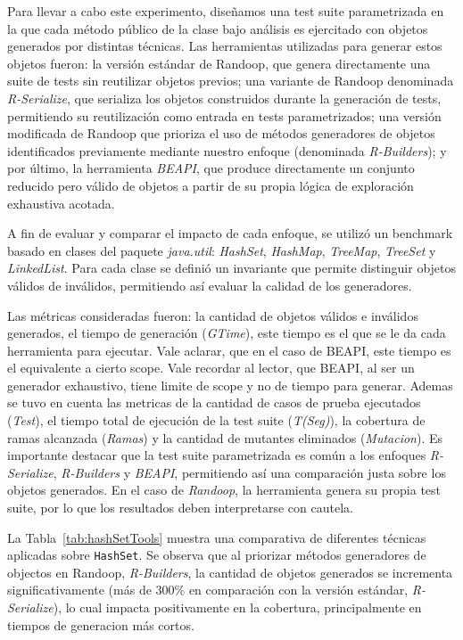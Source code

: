 Para llevar a cabo este experimento, diseñamos una test suite parametrizada en la que cada método 
público de la clase bajo análisis es ejercitado con objetos generados por distintas técnicas. Las 
herramientas utilizadas para generar estos objetos fueron: la versión estándar de Randoop, que 
genera directamente una suite de tests sin reutilizar objetos previos; una variante de Randoop 
denominada \emph{R-Serialize}, que serializa los objetos construidos durante la generación de 
tests, permitiendo su reutilización como entrada en tests parametrizados; una versión modificada 
de Randoop que prioriza el uso de métodos generadores de objetos identificados previamente mediante 
nuestro enfoque (denominada \emph{R-Builders}); y por último, la herramienta \emph{BEAPI}, que 
produce directamente un conjunto reducido pero válido de objetos a partir de su propia lógica de 
exploración exhaustiva acotada.

A fin de evaluar y comparar el impacto de cada enfoque, se utilizó un benchmark basado en clases 
del paquete \emph{java.util}: \emph{HashSet}, \emph{HashMap}, \emph{TreeMap}, \emph{TreeSet} y \emph{LinkedList}.
Para cada clase se definió un invariante que permite distinguir objetos válidos de inválidos, permitiendo así evaluar la calidad de los generadores.

Las métricas consideradas fueron: la cantidad de objetos válidos e inválidos generados, el tiempo 
de generación (\emph{GTime}), este tiempo es el que se le da cada herramienta para ejecutar. Vale aclarar,
que en el caso de BEAPI, este tiempo es el equivalente a cierto scope. Vale recordar al lector, que BEAPI, al ser un generador exhaustivo,
tiene limite de scope y no de tiempo para generar. 
Ademas se tuvo en cuenta las metricas de la cantidad de casos de prueba ejecutados (\emph{Test}), el 
tiempo total de ejecución de la test suite (\emph{T(Seg)}), la cobertura de ramas alcanzada 
(\emph{Ramas}) y la cantidad de mutantes eliminados (\emph{Mutacion}). Es importante destacar 
que la test suite parametrizada es común a los enfoques \emph{R-Serialize}, \emph{R-Builders} 
y \emph{BEAPI}, permitiendo así una comparación justa sobre los objetos generados. En el caso de 
\emph{Randoop}, la herramienta genera su propia test suite, por lo que los resultados deben 
interpretarse con cautela.



La Tabla~\ref{tab:hashSetTools} muestra una comparativa de diferentes técnicas aplicadas sobre 
\texttt{HashSet}. Se observa que al priorizar métodos generadores de objectos en Randoop, \emph{R-Builders}, la cantidad de 
objetos generados se incrementa significativamente (más de 300\% en comparación con la versión 
estándar, \emph{R-Serialize}), lo cual impacta positivamente en la cobertura, principalmente en tiempos de generacion más cortos.

